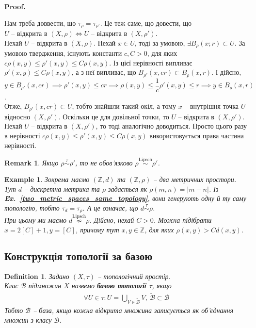 \documentclass[a4paper, 10pt]{article}
\makeatletter
\theoremstyle{theoremdd}
\newtheorem{definition}[theorem]{Definition}
\newtheorem{example}[theorem]{Example}
\newtheorem{remark}[theorem]{Remark}
\newcommand\exref[1]{\textbf{Ex.~\ref{#1}}}
\renewenvironment{proof}[1][Proof.\\]{\par
\pushQED{\hfill \qed}%
\normalfont \topsep6\p@\@plus6\p@\relax
\trivlist
\item\relax
{\bfseries
#1\@addpunct{.}}\hspace\labelsep\ignorespaces
}{%
\popQED\endtrivlist\@endpefalse
}
\makeatother
\begin{document}
\begin{proof}
Нам треба доввести, що $\tau_\rho = \tau_{\rho'}$. Це теж саме, що довести, що\\ $U$ -- відкрита в $(X,\rho) \iff U$ -- відкрита в $(X,\rho')$.\\
Нехай $U$ -- відкрита в $(X,\rho)$. Нехай $x \in U$, тоді за умовою, $\exists B_\rho(x;r) \subset U$. За умовою твердження, існують константи $c,C >0$, для яких $c \rho(x,y) \leq \rho'(x,y) \leq C \rho (x,y)$. Із цієї нерівності випливає $\rho'(x,y) \leq C \rho(x,y)$, а з неї випливає, що $B_{\rho'}(x, c r) \subset B_{\rho}(x,r)$. І дійсно,\\
$y \in B_{\rho'}(x,cr) \implies \rho'(x,y) \leq cr \implies \rho(x,y) \leq \dfrac{1}{c} \rho'(x,y) \leq r \implies y \in B_{\rho}(x,r)$.\\
Отже, $B_{\rho'}(x,cr) \subset U$, тобто знайшли такий окіл, а тому $x$ -- внутрішня точка $U$ відносно $(X,\rho')$. Оскільки це для довільної точки, то $U$ -- відкрита в $(X,\rho')$.\\
Нехай $U$ -- відкрита в $(X,\rho')$, то тоді аналогічно доводиться. Просто цього разу в нерівності $c \rho(x,y) \leq \rho'(x,y) \leq C \rho(x,y)$ використовується права частина нерівності.
\end{proof}

\begin{remark}
Якщо $\rho \overset{\tau}{\sim} \rho'$, то не обов'язково $\rho \overset{\text{Lipsch}}{\sim} \rho'$.
\end{remark}

\begin{example}
Зокрема маємо $(\mathbb{Z},d)$ та $(\mathbb{Z},\rho)$ -- два метричних простори. Тут $d$ -- дискретна метрика та $\rho$ задається як $\rho(m,n) = |m-n|$. Із \exref{two_metric_spaces_same_topology}, вони генерують одну й ту саму топологію, тобто $\tau_d = \tau_\rho$. А це означає, що $d \overset{\tau}{\sim} \rho$.\\
При цьому ми маємо $d \overset{\text{Lipsch}}{\not\sim} \rho$. Дійсно, нехай $C > 0$. Можна підібрати $x = 2 [C] + 1,y = [C]$, причому тут $x,y \in \mathbb{Z}$, для яких $\rho(x,y) > C d(x,y)$.
\end{example}

\subsection{Конструкція топології за базою}
\begin{definition}
Задано $(X,\tau)$ -- топологічний простір.\\
Клас $\mathcal{B}$ підмножин $X$ назвемо \textbf{базою топології $\tau$}, якщо
\begin{align*}
\forall U \in \tau: U = \bigcup_{V \in \mathcal{\tilde{B}}} V,\ \mathcal{\tilde{B}} \subset \mathcal{B}
\end{align*}
Тобто $\mathcal{B}$ -- база, якщо кожна відкрита множина записується як об'єднання множин з класу $\mathcal{B}$.
\end{definition}
\end{document}
